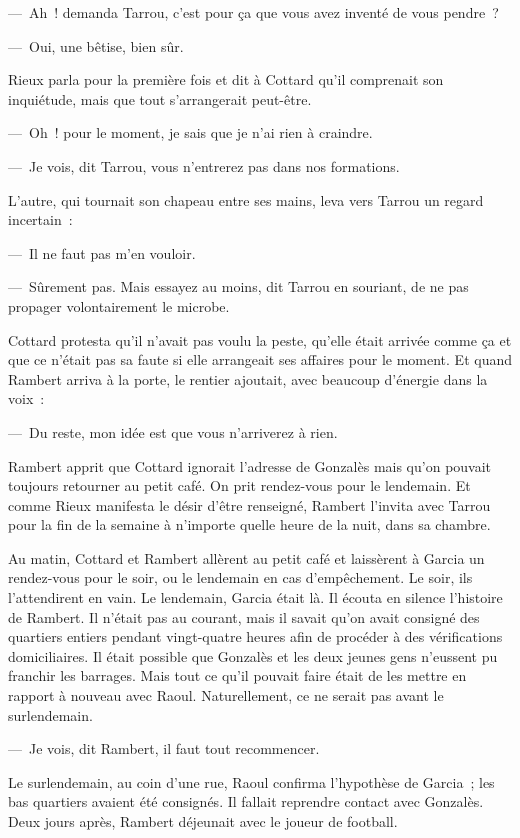 \documentclass[french,twoside]{book} %
\begin{document}
— Ah ! demanda Tarrou, c’est pour ça que vous avez inventé de vous pendre ?\par
— Oui, une bêtise, bien sûr.\par
Rieux parla pour la première fois et dit à Cottard qu’il comprenait son inquiétude, mais que tout s’arrangerait peut-être.\par
— Oh ! pour le moment, je sais que je n’ai rien à craindre.\par
— Je vois, dit Tarrou, vous n’entrerez pas dans nos formations.\par
L’autre, qui tournait son chapeau entre ses mains, leva vers Tarrou un regard incertain :\par
— Il ne faut pas m’en vouloir.\par
— Sûrement pas. Mais essayez au moins, dit Tarrou en souriant, de ne pas propager volontairement le microbe.\par
Cottard protesta qu’il n’avait pas voulu la peste, qu’elle était arrivée comme ça et que ce n’était pas sa faute si elle arrangeait ses affaires pour le moment. Et quand Rambert arriva à la porte, le rentier ajoutait, avec beaucoup d’énergie dans la voix :\par
— Du reste, mon idée est que vous n’arriverez à rien.\par
Rambert apprit que Cottard ignorait l’adresse de Gonzalès mais qu’on pouvait toujours retourner au petit café. On prit rendez-vous pour le lendemain. Et comme Rieux manifesta le désir d’être renseigné, Rambert l’invita avec Tarrou pour la fin de la semaine à n’importe quelle heure de la nuit, dans sa chambre.\par
Au matin, Cottard et Rambert allèrent au petit café et laissèrent à Garcia un rendez-vous pour le soir, ou le lendemain en cas d’empêchement. Le soir, ils l’attendirent en vain. Le lendemain, Garcia était là. Il écouta en silence l’histoire de Rambert. Il n’était pas au courant, mais il savait qu’on avait consigné des quartiers entiers pendant vingt-quatre heures afin de procéder à des vérifications domiciliaires. Il était possible que Gonzalès et les deux jeunes gens n’eussent pu franchir les barrages. Mais tout ce qu’il pouvait faire était de les mettre en rapport à nouveau avec Raoul. Naturellement, ce ne serait pas avant le surlendemain.\par
— Je vois, dit Rambert, il faut tout recommencer.\par
Le surlendemain, au coin d’une rue, Raoul confirma l’hypothèse de Garcia ; les bas quartiers avaient été consignés. Il fallait reprendre contact avec Gonzalès. Deux jours après, Rambert déjeunait avec le joueur de football.\par
\end{document}
